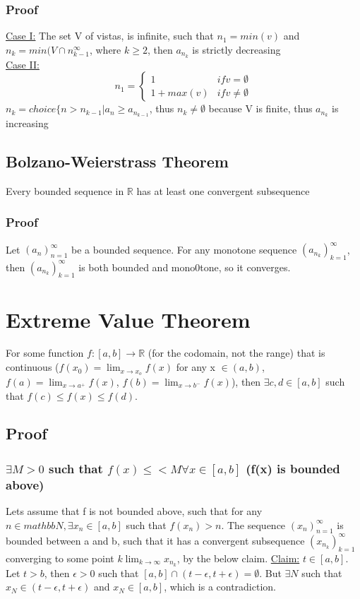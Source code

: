 \documentclass[11 pt, twoside]{article}
\begin{document}
\subsubsection{Proof}
\underline{Case I:} The set V of vistas, is infinite, such that $n_1 = min(v)$ and $n_k = min(V \cap n_{k-1}^\infty$, where $k \geq 2$, then $a_{n_k}$ is strictly decreasing\\
\underline{Case II:}
\[ n_1 =
\begin{cases}
1 & if v = \emptyset \\
1 + max(v) & if v \neq \emptyset
\end{cases} \]
$n_k = choice\{n > n_{k-1} | a_n \geq a_{n_{k-1}}$, thus $n_k \neq \emptyset$ because V is finite, thus $a_{n_k}$ is increasing

\subsection{Bolzano-Weierstrass Theorem}
Every bounded sequence in $\mathbb{R}$ has at least one convergent subsequence

\subsubsection{Proof}
Let $(a_n)^\infty_{n=1}$ be a bounded sequence. For any monotone sequence $(a_{n_k})^\infty_{k=1}$, then $(a_{n_k})^\infty_{k=1}$ is both bounded and mono0tone, so it converges.

\section{Extreme Value Theorem}
For some function $f:[a, b] \to \mathbb{R}$ (for the codomain, not the range) that is continuous ($f(x_0) = \lim_{x \to x_o}f(x)$ for any x $\in (a, b)$, $f(a) = \lim_{x \to a^+}f(x)$, $f(b) = \lim_{x \to b^-}f(x)$), then $\exists c, d \in [a, b]$ such that $f(c) \leq f(x) \leq f(d)$.

\subsection{Proof}
\subsubsection{$\exists M>0$ such that $f(x) \leq < M \forall x \in [a,b]$ (f(x) is bounded above)}
Lets assume that f is not bounded above, such that for any $n \in mathbb{N}, \exists x_n \in [a, b]$ such that $f(x_n) > n$.
The sequence $(x_n)^\infty_{n=1}$ is bounded between a and b, such that it has a convergent subsequence $(x_{n_k})^\infty_{k=1}$ converging to some point $k \lim_{k \to \infty} x_{n_k}$, by the below claim.
\underline{Claim:} $t \in [a, b]$. 
Let $t>b$, then $\epsilon > 0$ such that $[a, b] \cap (t-\epsilon, t+\epsilon) = \emptyset$. But $\exists N$ such that $x_N \in (t-\epsilon, t+\epsilon)$ and $x_N \in [a, b]$, which is a contradiction.
\end{document}

